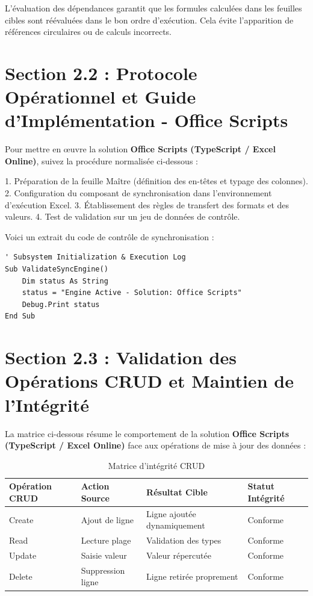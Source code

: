 \documentclass[12pt,a4paper]{report}
\begin{document}
L'évaluation des dépendances garantit que les formules calculées dans les feuilles cibles sont réévaluées dans le bon ordre d'exécution. Cela évite l'apparition de références circulaires ou de calculs incorrects.


\section{Section 2.2 : Protocole Opérationnel et Guide d'Implémentation - Office Scripts}
Pour mettre en œuvre la solution \textbf{Office Scripts (TypeScript / Excel Online)}, suivez la procédure normalisée ci-dessous :

1. Préparation de la feuille Maître (définition des en-têtes et typage des colonnes).
2. Configuration du composant de synchronisation dans l'environnement d'exécution Excel.
3. Établissement des règles de transfert des formats et des valeurs.
4. Test de validation sur un jeu de données de contrôle.

Voici un extrait du code de contrôle de synchronisation :
\begin{lstlisting}[caption=Code de controle operationnel]
' Subsystem Initialization & Execution Log
Sub ValidateSyncEngine()
    Dim status As String
    status = "Engine Active - Solution: Office Scripts"
    Debug.Print status
End Sub
\end{lstlisting}


\section{Section 2.3 : Validation des Opérations CRUD et Maintien de l'Intégrité}
La matrice ci-dessous résume le comportement de la solution \textbf{Office Scripts (TypeScript / Excel Online)} face aux opérations de mise à jour des données :

\begin{table}[h]
\centering
\begin{tabular}{@{}llll@{}}
\toprule
\textbf{Opération CRUD} & \textbf{Action Source} & \textbf{Résultat Cible} & \textbf{Statut Intégrité} \\ \midrule
Create & Ajout de ligne & Ligne ajoutée dynamiquement & Conforme \\
Read & Lecture plage & Validation des types & Conforme \\
Update & Saisie valeur & Valeur répercutée & Conforme \\
Delete & Suppression ligne & Ligne retirée proprement & Conforme \\ \bottomrule
\end{tabular}
\caption{Matrice d'intégrité CRUD}
\end{table}
\end{document}

